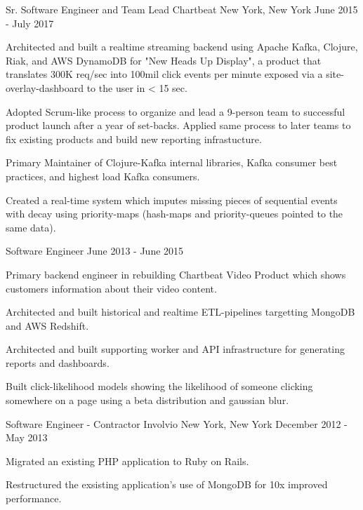 
\begin{cventries}

	\cventry
	{Sr. Software Engineer and Team Lead}
	{Chartbeat}
	{New York, New York}
	{June 2015 - July 2017}
	{
		\begin{cvitems}
		\item {Architected and built a realtime streaming backend using Apache Kafka, Clojure, Riak, and AWS DynamoDB for "New Heads Up Display", a product that translates 300K req/sec into 100mil click events per minute exposed via a site-overlay-dashboard to the user in < 15 sec.}
		\item {Adopted Scrum-like process to organize and lead a 9-person team to successful product launch after a year of set-backs. Applied same process to later teams to fix existing products and build new reporting infrastucture.}
		\item {Primary Maintainer of Clojure-Kafka internal libraries, Kafka consumer best practices, and highest load Kafka consumers.}
		\item {Created a real-time system which imputes missing pieces of sequential events with decay using priority-maps (hash-maps and priority-queues pointed to the same data).}
		\end{cvitems}
	}


	\cventry
	{Software Engineer}
	{}
	{}
	{June 2013 - June 2015}
	{
		\begin{cvitems}
		\item {Primary backend engineer in rebuilding Chartbeat Video Product which shows customers information about their video content.}
		\item {Architected and built historical and realtime ETL-pipelines targetting MongoDB and AWS Redshift.}
		\item {Architected and built supporting worker and API infrastructure for generating reports and dashboards.}
		\item {Built click-likelihood models showing the likelihood of someone clicking somewhere on a page using a beta distribution and gaussian blur.}
		\end{cvitems}
	}


	\cventry
	{Software Engineer - Contractor}
	{Involvio}
	{New York, New York}
	{December 2012 - May 2013}
	{
		\begin{cvitems}
		\item {Migrated an existing PHP application to Ruby on Rails.}
		\item {Restructured the exsisting application's use of MongoDB for 10x improved performance.}
		\end{cvitems}
	}


\end{cventries}
